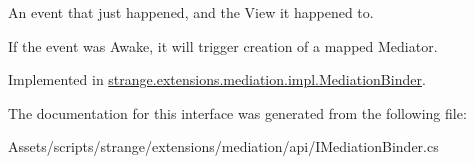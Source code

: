 An event that just happened, and the View it happened to. 

If the event was Awake, it will trigger creation of a mapped Mediator. 

Implemented in \hyperlink{classstrange_1_1extensions_1_1mediation_1_1impl_1_1_mediation_binder_a239e22ae10b9abac39d32533771457f8}{strange.\-extensions.\-mediation.\-impl.\-Mediation\-Binder}.



The documentation for this interface was generated from the following file\-:\begin{DoxyCompactItemize}
\item 
Assets/scripts/strange/extensions/mediation/api/I\-Mediation\-Binder.\-cs\end{DoxyCompactItemize}

